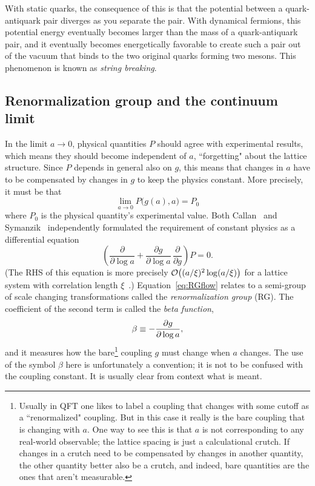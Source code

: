 With static quarks, the consequence of this is that
the potential between a quark-antiquark pair diverges as you separate the pair.
With dynamical fermions, this potential energy eventually becomes larger than
the mass of a quark-antiquark pair, and it eventually becomes energetically
favorable to create such a pair out of the vacuum that binds to the two original
quarks forming two mesons. This phenomenon is known as 
{\it string breaking}.


\subsection{Renormalization group and the continuum limit}


In the limit $a\to0$, physical quantities $P$ should agree with experimental
results, which means they should become independent of $a$, ``forgetting"
about the lattice structure. Since $P$ depends in general also on $g$,
this means that changes in $a$ have to be compensated by changes in $g$
to keep the physics constant. More precisely, it must be that 
\begin{equation}
  \lim_{a\to0}P\Big(g(a),a\Big)=P_0
\end{equation}
where $P_0$ is the physical quantity's experimental value.
Both Callan~\cite{callan_broken_1970} and
Symanzik~\cite{symanzik_small_1970,symanzik_small-distance-behaviour_1971}
independently formulated the requirement of constant physics as
a differential equation
\begin{equation}\label{eq:RGflow}
  \left(\frac{\partial}{\partial\log a}
        +\frac{\partial g}{\partial\log a}
         \,\frac{\partial}{\partial g}\right)P=0. 
\end{equation}
(The RHS of this equation is more precisely
$\order{(a/\xi)^2\log(a/\xi)}$ for a lattice system
with correlation length $\xi$~\cite{montvay_quantum_1994}.)
Equation~\eqref{eq:RGflow} relates to a semi-group of scale 
changing transformations called the {\it renormalization group} (RG). 
The coefficient of the second term is called the {\it beta function},
\begin{equation}\label{eq:betafunction}\index{beta function}
  \beta\equiv-\frac{\partial g}{\partial\log a},
\end{equation}
and it measures how the bare\footnote{Usually in QFT one likes to label
a coupling that changes with some cutoff as a ``renormalized" coupling.
But in this case it really is the bare coupling that is changing with $a$.
One way to see this is that $a$ is not corresponding to any real-world
observable; the lattice spacing is just a calculational crutch. If changes
in a crutch need to be compensated by changes in another quantity,
the other quantity better also be a crutch, and indeed, bare quantities
are the ones that aren't measurable.}
coupling $g$ must change when $a$ changes.
The use of the symbol $\beta$ here is unfortunately a convention; it
is not to be confused with the coupling constant. It is usually clear
from context what is meant. 


